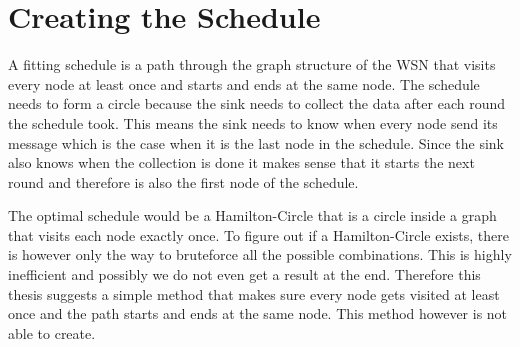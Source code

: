 \section{Creating the Schedule}
\label{chp:apr_creatingSchedule}
A fitting schedule is a path through the graph structure of the WSN that visits every node at least once and starts and ends at the same node. The schedule needs to form a circle because the sink needs to collect the data after each round the schedule took. This means the sink needs to know when every node send its message which is the case when it is the last node in the schedule. Since the sink also knows when the collection is done it makes sense that it starts the next round and therefore is also the first node of the schedule. 

The optimal schedule would be a Hamilton-Circle that is a circle inside a graph that visits each node exactly once. To figure out if a Hamilton-Circle exists, there is however only the way to bruteforce all the possible combinations. This is highly inefficient and possibly we do not even get a result at the end. Therefore this thesis suggests a simple method that makes sure every node gets visited at least once and the path starts and ends at the same node. This method however is not able to create.

